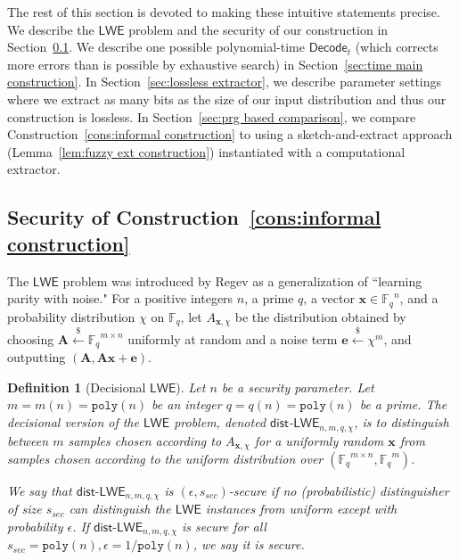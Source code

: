 \documentclass[11pt]{article}
\newcommand{\secref}[1]{\mbox{Section~\ref{#1}}}
\newcommand{\lemref}[1]{\mbox{Lemma~\ref{#1}}}
\newcommand{\consref}[1]{\mbox{Construction~\ref{#1}}}
\newcommand{\class}[1]{{\ensuremath{\mathsf{#1}}}}
\newcommand{\vect}[1]{\ensuremath{\textbf{#1}}}
\newcommand{\Fq}{\ensuremath{\mathbb{F}_q}}
\newcommand{\decode}{\ensuremath{\mathsf{Decode}}}
\newcommand{\poly}{\ensuremath{\mathtt{poly}}\xspace}
\newcommand{\lwe}{\class{LWE}}
\newcommand{\LWE}{\class{LWE}}
\newcommand{\distLWE}{\ensuremath{\class{dist\mbox{-}LWE}}}
\newtheorem{definition}[theorem]{Definition}
\newcommand{\ve}{\vect{e}}
\newcommand{\vA}{\vect{A}}
\newcommand{\vx}{\vect{x}}
\begin{document}
The rest of this section is devoted to making these intuitive statements precise.
 We describe the \class{LWE} problem and the security of our construction in \secref{subsec:LWE}.
We describe one possible polynomial-time $\decode_t$ (which corrects more errors than is possible by exhaustive search) in \secref{sec:time main construction}.  In \secref{sec:lossless extractor}, we describe parameter settings where we extract as many bits as the size of our input distribution and thus our construction is lossless.  In \secref{sec:prg based comparison}, we compare \consref{cons:informal construction} to using a sketch-and-extract approach (\lemref{lem:fuzzy ext construction}) instantiated with a computational extractor. 



\subsection{Security of \consref{cons:informal construction}}
\label{subsec:LWE}
The $\LWE$ problem was introduced by Regev \cite{regev2005LWE, regevLWEsurvey} as a generalization of ``learning parity with noise." For a positive integers $n$,  a prime $q$, a vector $\vx \in \Fq^n$, and a probability distribution $\chi$ on $\Fq$, let $A_{\vect{x}, \chi}$ be the distribution obtained by choosing $\vA \overset{\$}\leftarrow \Fq^{m\times n}$ uniformly at random and a noise term $\ve \overset{\$}\leftarrow \chi^m$, and outputting $(\vA, \vA\vx+\ve)$. 

\begin{definition}[Decisional $\lwe$]\label{def:dist-LWE}Let $n$ be a security parameter.  
Let $m = m(n) = \poly(n)$ be an integer $q = q(n) = \poly(n)$ be a prime. The decisional version of the $\LWE$ problem, denoted \class{dist}-$\LWE_{n, m, q, \chi}$, is to distinguish between $m$ samples chosen according to $A_{\vx, \chi}$ for a uniformly random $\vx$ from samples chosen according to the uniform distribution over $(\Fq^{m\times n}, \Fq^m)$. 

We say that $\distLWE_{n, m, q, \chi}$ is $(\epsilon, s_{sec})$-secure if no (probabilistic) distinguisher of size $s_{sec}$ can distinguish the $\lwe$ instances from uniform except with probability $\epsilon$.  If $\distLWE_{n, m, q, \chi}$ is secure for all $s_{sec} = \poly(n), \epsilon  = 1/\poly(n)$, we say it is \emph{secure}.
\end{definition}
\end{document}
